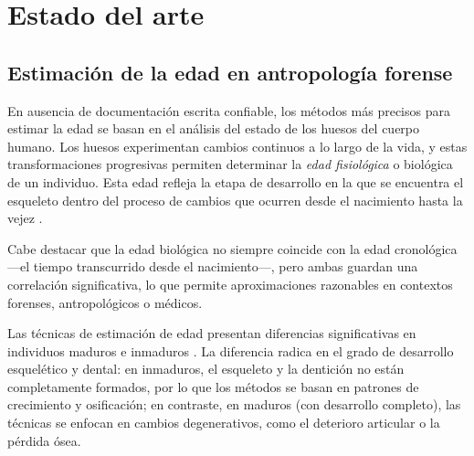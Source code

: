 \chapter{Estado del arte}


\section{Estimación de la edad en antropología forense}

En ausencia de documentación escrita confiable, los métodos más precisos para estimar la edad se basan en el 
análisis del estado de los huesos del cuerpo humano. Los huesos experimentan cambios continuos a lo largo de 
la vida, y estas transformaciones progresivas permiten determinar la \textit{edad fisiológica} o biológica de 
un individuo. Esta edad refleja la etapa de desarrollo en la que se encuentra el esqueleto dentro del proceso 
de cambios que ocurren desde el nacimiento hasta la vejez \cite{byers2023}.

Cabe destacar que la edad biológica no siempre coincide con la edad cronológica ---el tiempo transcurrido 
desde el nacimiento---, pero ambas guardan una correlación significativa, lo que permite aproximaciones 
razonables en contextos forenses, antropológicos o médicos.

Las técnicas de estimación de edad presentan diferencias significativas en individuos maduros e inmaduros
\cite{ubelaker2019}. La diferencia radica en el grado de desarrollo esquelético y dental: en inmaduros, el 
esqueleto y la dentición no están completamente formados, por lo que los métodos se basan en patrones de 
crecimiento y osificación; en contraste, en maduros (con desarrollo completo), las técnicas se enfocan en 
cambios degenerativos, como el deterioro articular o la pérdida ósea.


